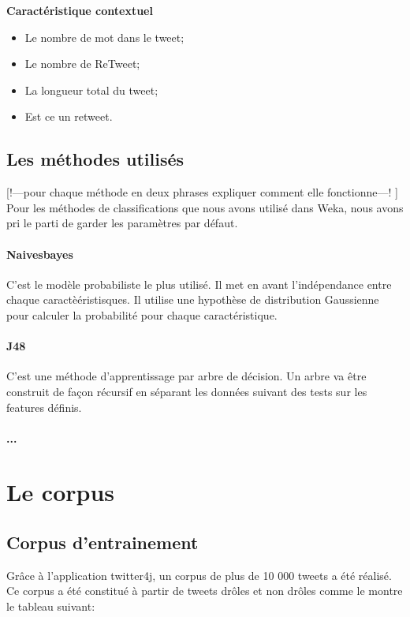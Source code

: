 \documentclass[10pt,a4paper,twoside]{article}
\begin{document}
\textbf{Caractéristique contextuel}
\begin{itemize}
\item Le nombre de mot dans le tweet;
\item Le nombre de ReTweet;
\item La longueur total du tweet;
\item Est ce un retweet.
\end{itemize}
\vspace{0.5cm}

\subsection{Les méthodes utilisés} [!---pour chaque méthode en deux phrases expliquer comment elle fonctionne---! ]
\label{methode}
Pour les méthodes de classifications que nous avons utilisé dans Weka, nous avons pri le parti de garder les paramètres par défaut. 
\paragraph{Naivesbayes} C'est le modèle probabiliste le plus utilisé. Il met en avant l'indépendance entre chaque caractèéristisques. Il utilise une hypothèse de distribution Gaussienne pour calculer la probabilité pour chaque caractéristique.
\paragraph{J48} C'est une méthode d'apprentissage par arbre de décision. Un arbre va être construit de façon récursif en séparant les données suivant des tests sur les features définis. 
\paragraph{...}




\section{Le corpus}

\subsection{Corpus d'entrainement}
Grâce à l'application twitter4j, un corpus de plus de 10 000 tweets a été réalisé. Ce corpus a été constitué à partir de tweets drôles et non drôles comme le montre le tableau suivant: 
\end{document}
